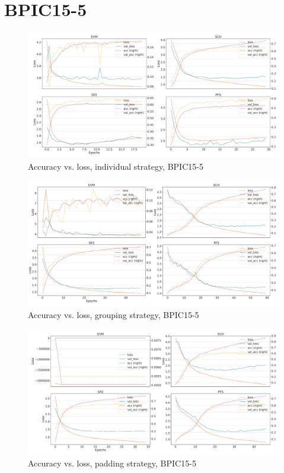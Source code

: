 \section*{BPIC15-5}
\begin{figure}[!htb]
    \centering
    \includegraphics[width=\textwidth]{gfx/bpic2015_5/individual_loss_acc_curve.pdf}
    \caption{Accuracy vs. loss, individual strategy, BPIC15-5}
\end{figure}
\begin{figure}[!htb]
    \centering
    \includegraphics[width=\textwidth]{gfx/bpic2015_5/grouped_loss_acc_curve.pdf}
    \caption{Accuracy vs. loss, grouping strategy, BPIC15-5}
\end{figure}
\begin{figure}[!htb]
    \centering
    \includegraphics[width=\textwidth]{gfx/bpic2015_5/padded_loss_acc_curve.pdf}
    \caption{Accuracy vs. loss, padding strategy, BPIC15-5}
\end{figure}
